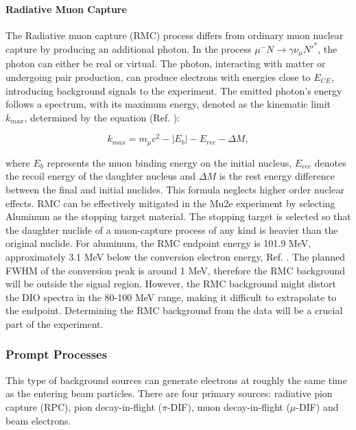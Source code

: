 \paragraph{Radiative Muon Capture}

The Radiative muon capture (RMC) process differs from ordinary muon nuclear capture by producing an additional photon. In the process $\mu^- N \rightarrow\gamma \nu_\mu N'^* $, the photon can either be real or virtual. The photon, interacting with matter or undergoing pair production, can produce electrons with energies close to $E_{CE}$, introducing background signals to the experiment. The emitted photon's energy follows a spectrum, with its maximum energy, denoted as the kinematic limit $k_{max}$, determined by the equation (Ref. \cite{bartoszek2015mu2e}):

\begin{equation}
k_{max} = m_\mu c^2 - |E_b| - E_{rec} - \Delta M ,
\end{equation}

where $E_b$ represents the muon binding energy on the initial nucleus, $E_{rec}$ denotes 
the recoil energy of the daughter nucleus and $\Delta M$ is the rest energy difference 
between the final and initial nuclides. This formula neglects higher order nuclear effects. 
RMC can be effectively mitigated in the Mu2e experiment by selecting Aluminum as the stopping 
target material. The stopping target is selected so that the daughter nuclide of a muon-capture 
process of any kind is heavier than the original nuclide. For aluminum, the RMC endpoint energy 
is 101.9 MeV, approximately 3.1 MeV below the conversion electron energy, Ref. \cite{bartoszek2015mu2e}. 
The planned FWHM of the conversion peak is around 1 MeV, therefore the RMC background will be 
outside the signal region. However, the RMC background might distort the DIO spectra in the 80-100 MeV 
range, making it difficult to extrapolate to the endpoint. Determining the RMC background from the 
data will be a crucial part of the experiment.
\subsubsection{Prompt Processes}
This type of background sources can generate electrons at roughly the same time as 
the entering beam particles. There are four primary sources: radiative pion capture (RPC), 
pion decay-in-flight ($\pi$-DIF), muon decay-in-flight ($\mu$-DIF) and beam electrons.
